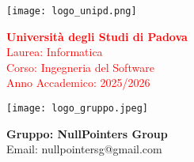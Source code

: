 \begin{minipage}{0.4\textwidth}
    \texttt{[image: logo\_unipd.png]}
\end{minipage}
\begin{minipage}{0.55\textwidth}
    \textcolor{red}{\textbf{Università degli Studi di Padova}} \\
    \textcolor{red}{Laurea: Informatica} \\
    \textcolor{red}{Corso: Ingegneria del Software} \\
    \textcolor{red}{Anno Accademico: 2025/2026}
\end{minipage}

\begin{minipage}{0.4\textwidth}
    \texttt{[image: logo\_gruppo.jpeg]}
\end{minipage}
\begin{minipage}{0.55\textwidth}
    \textbf{Gruppo: NullPointers Group} \\
    Email: \textsf{nullpointersg@gmail.com}
\end{minipage}

\vspace{2cm}